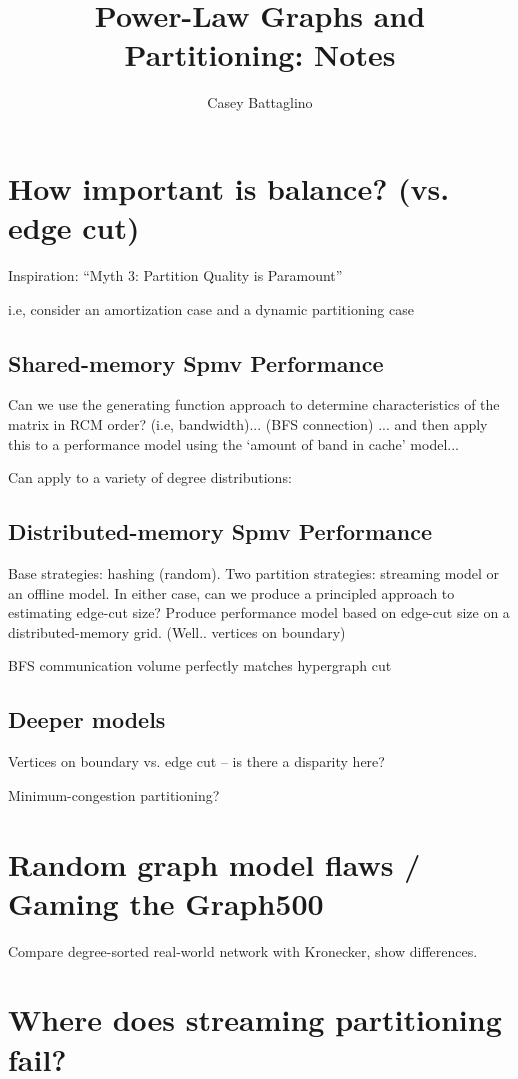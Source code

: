 \documentclass[11pt]{article}
\title{Power-Law Graphs and Partitioning: Notes}
\author{Casey Battaglino}
\date{}
\begin{document}
\maketitle
\tableofcontents

\section{How important is balance? (vs. edge cut)}
Inspiration: ``Myth 3: Partition Quality is Paramount''

i.e, consider an amortization case and a dynamic partitioning case

\subsection{Shared-memory Spmv Performance}
Can we use the generating function approach to determine characteristics of the matrix in RCM order? (i.e, bandwidth)... (BFS connection) ... and then apply this to a performance model using the `amount of band in cache' model...

Can apply to a variety of degree distributions:


\subsection{Distributed-memory Spmv Performance}
Base strategies: hashing (random).
Two partition strategies: streaming model or an offline model. In either case, can we produce a principled approach to estimating edge-cut size? Produce performance model based on edge-cut size on a distributed-memory grid. (Well.. vertices on boundary)

BFS communication volume perfectly matches hypergraph cut \cite{Catalyurek_hypergraph-partitioningbased}

\subsection{Deeper models}
Vertices on boundary vs. edge cut -- is there a disparity here?

Minimum-congestion partitioning?

\section{Random graph model flaws / Gaming the Graph500}
Compare degree-sorted real-world network with Kronecker, show differences.

\section{Where does streaming partitioning fail?}
\end{document}
